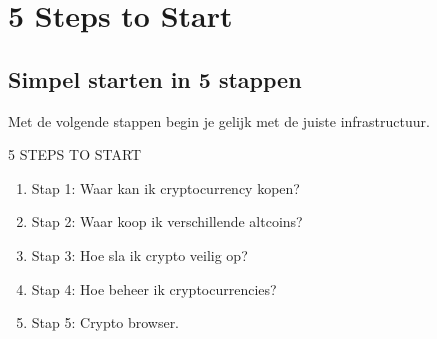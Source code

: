 \chapter{5 Steps to Start}
\label{app:5steps}

\section*{Simpel starten in 5 stappen}
Met de volgende stappen begin je gelijk met de juiste infrastructuur. 

\bigskip
\begin{cryptobox}{5 STEPS TO START}
\begin{enumerate}[label=(\alph*)]
\setlength\itemsep{0em}
    \item Stap 1: Waar kan ik cryptocurrency kopen?  
    \item Stap 2: Waar koop ik verschillende altcoins?
    \item Stap 3: Hoe sla ik crypto veilig op?
    \item Stap 4: Hoe beheer ik cryptocurrencies?
    \item Stap 5: Crypto browser.
\end{enumerate}
\end{cryptobox}



